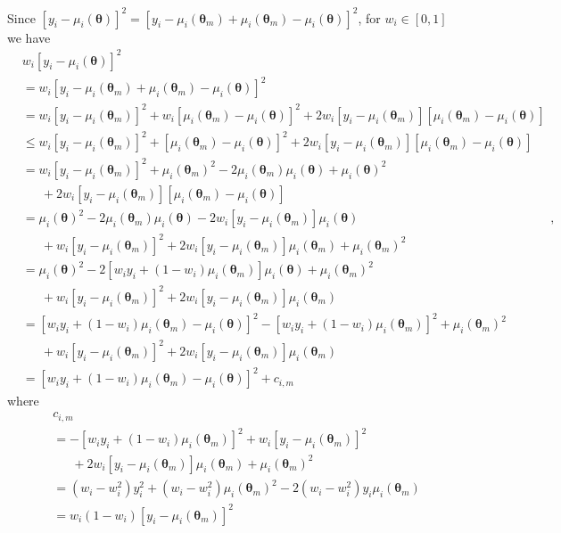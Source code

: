 \documentclass{scrartcl}
\begin{document}
Since $[y_i-\mu_i(\pmb{\theta})]^2 =
[y_i-\mu_i(\pmb{\theta}_m)+\mu_i(\pmb{\theta}_m)-\mu_i(\pmb{\theta})]^2$,
for $w_i \in [0, 1]$ we have
\begin{equation}
\begin{split}
& w_i [y_i-\mu_i(\pmb{\theta})]^2 \\
& = w_i [y_i-\mu_i(\pmb{\theta}_m)+\mu_i(\pmb{\theta}_m)-\mu_i(\pmb{\theta})]^2 \\
& = w_i [y_i-\mu_i(\pmb{\theta}_m)]^2 + w_i [\mu_i(\pmb{\theta}_m)-\mu_i(\pmb{\theta})]^2
    + 2w_i[y_i-\mu_i(\pmb{\theta}_m)][\mu_i(\pmb{\theta}_m)-\mu_i(\pmb{\theta})] \\
& \le w_i [y_i-\mu_i(\pmb{\theta}_m)]^2 + [\mu_i(\pmb{\theta}_m)-\mu_i(\pmb{\theta})]^2
    + 2w_i[y_i-\mu_i(\pmb{\theta}_m)][\mu_i(\pmb{\theta}_m)-\mu_i(\pmb{\theta})] \\
& = w_i [y_i-\mu_i(\pmb{\theta}_m)]^2
+\mu_i(\pmb{\theta}_m)^2 - 2 \mu_i(\pmb{\theta}_m)\mu_i(\pmb{\theta}) + \mu_i(\pmb{\theta})^2 \\
& \phantom{=}\, + 2w_i[y_i-\mu_i(\pmb{\theta}_m)][\mu_i(\pmb{\theta}_m)-\mu_i(\pmb{\theta})] \\
& = \mu_i(\pmb{\theta})^2 - 2 \mu_i(\pmb{\theta}_m)\mu_i(\pmb{\theta})
- 2w_i[y_i-\mu_i(\pmb{\theta}_m)]\mu_i(\pmb{\theta}) \\
& \phantom{=}\, + w_i [y_i-\mu_i(\pmb{\theta}_m)]^2 + 2w_i[y_i-\mu_i(\pmb{\theta}_m)]\mu_i(\pmb{\theta}_m) +\mu_i(\pmb{\theta}_m)^2 \\
& = \mu_i(\pmb{\theta})^2
- 2 [ w_i y_i + (1-w_i) \mu_i(\pmb{\theta}_m) ] \mu_i(\pmb{\theta}) +\mu_i(\pmb{\theta}_m)^2 \\
& \phantom{=}\, + w_i [y_i-\mu_i(\pmb{\theta}_m)]^2 + 2w_i[y_i-\mu_i(\pmb{\theta}_m)]\mu_i(\pmb{\theta}_m) \\
& = [w_i y_i + (1-w_i) \mu_i(\pmb{\theta}_m) - \mu_i(\pmb{\theta})]^2
  - [w_i y_i + (1-w_i) \mu_i(\pmb{\theta}_m)]^2 +\mu_i(\pmb{\theta}_m)^2 \\
& \phantom{=}\, + w_i [y_i-\mu_i(\pmb{\theta}_m)]^2 + 2w_i[y_i-\mu_i(\pmb{\theta}_m)]\mu_i(\pmb{\theta}_m) \\
& = [w_i y_i + (1-w_i) \mu_i(\pmb{\theta}_m) - \mu_i(\pmb{\theta})]^2 + c_{i,m}
\end{split} , 
\end{equation}
where 
\begin{equation}
\begin{split}
& c_{i,m} \\
& = - [w_i y_i + (1-w_i) \mu_i(\pmb{\theta}_m)]^2
  + w_i [y_i-\mu_i(\pmb{\theta}_m)]^2 \\
& \phantom{=}\,  + 2w_i[y_i-\mu_i(\pmb{\theta}_m)]\mu_i(\pmb{\theta}_m)
  +\mu_i(\pmb{\theta}_m)^2 \\
& = (w_i-w_i^2)y_i^2+(w_i-w_i^2)\mu_i(\pmb{\theta}_m)^2
-2(w_i-w_i^2)y_i\mu_i(\pmb{\theta}_m) \\
& = w_i(1-w_i)[y_i-\mu_i(\pmb{\theta}_m)]^2
\end{split}
\end{equation}
\end{document}
